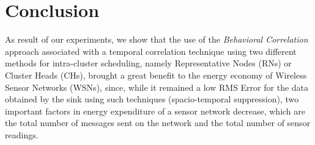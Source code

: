 \documentclass[conference]{IEEEtran}
\begin{document}
%





\section{Conclusion}

As result of our experiments, we show that the use of the \textit{Behavioral
Correlation} approach associated with a temporal correlation technique using two
different methods for intra-cluster scheduling, namely Representative Nodes
(RNs) or Cluster Heads (CHs), brought a great benefit to the energy economy of
Wireless Sensor Networks (WSNs), since, while it remained a low RMS Error for
the data obtained by the sink using such techniques (spacio-temporal
suppression), two important factors in energy expenditure of a sensor network
decrease, which are the total number of messages sent on the network and the
total number of sensor readings.


\end{document}
